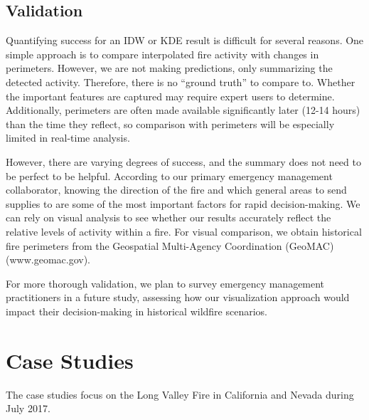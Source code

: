 
\subsection{Validation}
Quantifying success for an IDW or KDE result is difficult for several reasons. One simple approach is to compare interpolated fire activity with changes in perimeters. However, we are not making predictions, only summarizing the detected activity. Therefore, there is no ``ground truth'' to compare to. Whether the important features are captured may require expert users to determine. Additionally, perimeters are often made available significantly later (12-14 hours) than the time they reflect, so comparison with perimeters will be especially limited in real-time analysis.

However, there are varying degrees of success, and the summary does not need to be perfect to be helpful. According to our primary emergency management collaborator, knowing the direction of the fire and which general areas to send supplies to are some of the most important factors for rapid decision-making. We can rely on visual analysis to see whether our results accurately reflect
the relative levels of activity within a fire. For visual comparison, we obtain historical fire perimeters from the Geospatial Multi-Agency Coordination (GeoMAC) (www.geomac.gov).

For more thorough validation, we plan to survey emergency management practitioners in a future study, assessing how our visualization approach would impact their decision-making in historical wildfire scenarios. 

\section{Case Studies}
The case studies focus on the Long Valley Fire in California and Nevada during July 2017.


